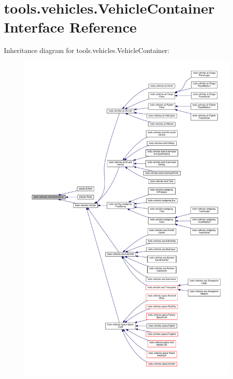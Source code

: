\hypertarget{interfacetools_1_1vehicles_1_1_vehicle_container}{}\section{tools.\+vehicles.\+Vehicle\+Container Interface Reference}
\label{interfacetools_1_1vehicles_1_1_vehicle_container}


Inheritance diagram for tools.\+vehicles.\+Vehicle\+Container\+:
\nopagebreak
\begin{figure}[H]
\begin{center}
\leavevmode
\includegraphics[width=350pt]{interfacetools_1_1vehicles_1_1_vehicle_container__inherit__graph}
\end{center}
\end{figure}
